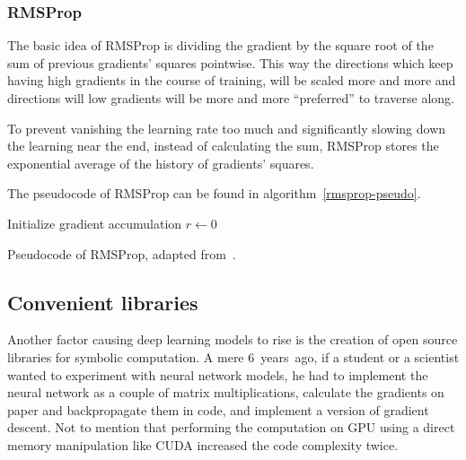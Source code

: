 \subsubsection{RMSProp}\label{rmsprop-section}
The basic idea of RMSProp is dividing the gradient by the square root of the sum of previous gradients' squares pointwise. This way the directions which keep having high gradients in the course of training, will be scaled more and more and directions will low gradients will be more and more ``preferred'' to traverse along.

To prevent vanishing the learning rate too much and significantly slowing down the learning near the end, instead of calculating the sum, RMSProp stores the exponential average of the history of gradients' squares.

The pseudocode of RMSProp can be found in algorithm~\ref{rmsprop-pseudo}.
\begin{algorithm}
  \DontPrintSemicolon
  Initialize gradient accumulation $r \leftarrow 0$\;
  \caption{Pseudocode of RMSProp, adapted from~\cite{dlbook}.}\label{rmsprop-pseudo}
\end{algorithm}

\subsection{Convenient libraries}
Another factor causing deep learning models to rise is the creation of open source libraries for symbolic computation. A mere $6$~years~ago, if a student or a scientist wanted to experiment with neural network models, he had to implement the neural network as a couple of matrix multiplications, calculate the gradients on paper and backpropagate them in code, and implement a version of gradient descent. Not to mention that performing the computation on GPU using a direct memory manipulation like CUDA increased the code complexity twice.


